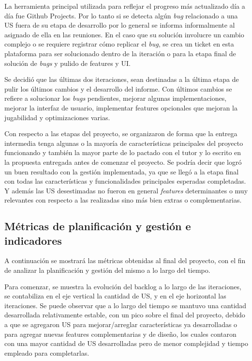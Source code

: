 La herramienta principal utilizada para reflejar el progreso más actualizado día a día fue Github Projects. Por lo tanto 
si se detecta algún \textit{bug} relacionado a una US fuera de su etapa de desarrollo por lo general se informa informalmente 
al asignado de ella en las reuniones. En el caso que su solución involucre un cambio complejo o se requiere registrar cómo 
replicar el \textit{bug}, se crea un ticket en esta plataforma para ser solucionado dentro de la iteración o para la etapa final 
de solución de \textit{bugs} y pulido de features y UI.
\vspace{0.25cm}

Se decidió que las últimas dos iteraciones, sean destinadas a la última 
etapa de pulir los últimos cambios y el desarrollo del informe. Con últimos cambios se refiere a solucionar los \textit{bugs} 
pendientes, mejorar algunas implementaciones, mejorar la interfaz de usuario, implementar features opcionales 
que mejoran la jugabilidad y optimizaciones varias.

\vspace{0.25cm}

Con respecto a las etapas del proyecto, se organizaron de forma que la entrega intermedia tenga algunas o la 
mayoría de características principales del proyecto funcionando y también la mayor parte de lo pactado con el tutor y lo 
escrito en la propuesta entregada antes de comenzar el proyecto. Se podría decir que logró un buen resultado con la gestión 
implementada, ya que se llegó a la etapa final con todas las características y funcionalidades principales esperadas 
completadas. Y además las US desestimadas no fueron en general \textit{features} determinantes o muy relevantes con respecto a 
las realizadas sino más bien extras o complementarias.

\subsection{Métricas de planificación y gestión e indicadores}

A continuación se mostrará las métricas obtenidas al final del proyecto, con el fin de analizar la planificación 
y gestión del mismo a lo largo del tiempo.

Para comenzar, se muestra la evolución del backlog a lo largo de las iteraciones, se contabiliza en el eje vertical 
la cantidad de US, y en el eje horizontal las iteraciones. 
Se puede observar que a lo largo del tiempo se mantuvo una cantidad desarrollada relativamente estable, 
con un pico sobre el final del proyecto, debido a que se agregaron US para mejorar/arreglar características ya 
desarrolladas o para agregar nuevas features complementarias y de diseño, los cuales contaron con una mayor cantidad de US 
desarrolladas pero de menor complejidad y tiempo empleado para completarlas.

